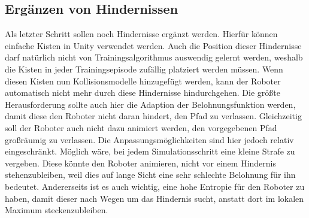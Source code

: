 \subsection{Ergänzen von Hindernissen}
Als letzter Schritt sollen noch Hindernisse ergänzt werden.
Hierfür können einfache Kisten in Unity verwendet werden.
Auch die Position dieser Hindernisse darf natürlich nicht von Trainingsalgorithmus auswendig gelernt werden, weshalb die Kisten in jeder Trainingsepisode zufällig platziert werden müssen.
Wenn diesen Kisten nun Kollisionsmodelle hinzugefügt werden, kann der Roboter automatisch nicht mehr durch diese Hindernisse hindurchgehen.
Die größte Herausforderung sollte auch hier die Adaption der Belohnungsfunktion werden, damit diese den Roboter nicht daran hindert, den Pfad zu verlassen.
Gleichzeitig soll der Roboter auch nicht dazu animiert werden, den vorgegebenen Pfad großräumig zu verlassen.
Die Anpassungsmöglichkeiten sind hier jedoch relativ eingeschränkt.
Möglich wäre, bei jedem Simulationsschritt eine kleine Strafe zu vergeben.
Diese könnte den Roboter animieren, nicht vor einem Hindernis stehenzubleiben, weil dies auf lange Sicht eine sehr schlechte Belohnung für ihn bedeutet.
Andererseits ist es auch wichtig, eine hohe Entropie für den Roboter zu haben, damit dieser nach Wegen um das Hindernis sucht, anstatt dort im lokalen Maximum steckenzubleiben.

    
